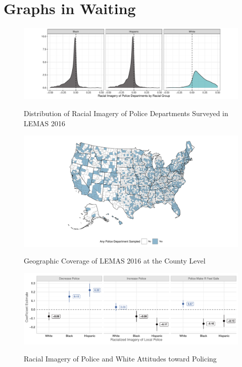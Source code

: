 \section{Graphs in Waiting}
\begin{figure}[t]
    \centering
    \caption{Distribution of Racial Imagery of Police Departments Surveyed in LEMAS 2016} 
	\includegraphics[width = \linewidth]{figures/desc-lemas2.pdf}
    \label{fig:lemas-density}
\end{figure}

\begin{figure}[t]  \centering
    \caption{Geographic Coverage of LEMAS 2016 at the County Level} 
	\includegraphics[width = \linewidth]{figures/lemas-map-ct.pdf}
    \label{fig:lemas-geo}
\end{figure}

\begin{figure}[t]  \centering
    \caption{Racial Imagery of Police and White Attitudes toward Policing} 
	\includegraphics[width = \linewidth]{figures/imagery & attitudes 2}
    \label{fig:baseline}
    \fnote{}
\end{figure}

